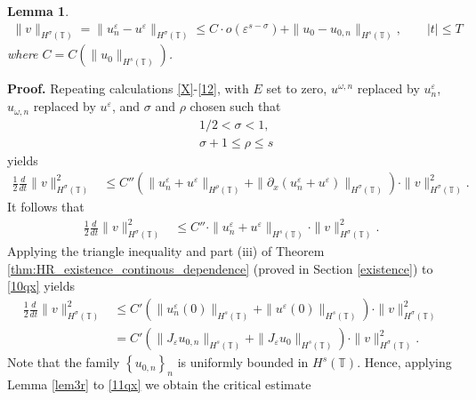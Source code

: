 \documentclass[12pt,reqno]{amsart}
\newcommand{\p}{\partial}
\newcommand{\ci}{\mathbb{T}}
\newcommand{\ee}{\varepsilon}
\theoremstyle{plain}  %
\newtheorem{lemma}{Lemma}
\theoremstyle{definition}
\begin{document}
\begin{appendices}
\begin{lemma}
\begin{equation}
\begin{split}
		\|v\|_{H^{\sigma}(\ci)} = 
		\|u^\ee_n - u^\ee\|_{H^\sigma(\ci)}
		\le C \cdot o(\ee^{s- \sigma }) + \|u_0 - u_{0,n} \|_{H^s(\ci)}, \qquad |t| \le T
	\end{split}
\end{equation}
where $C=C(\|u_0\|_{H^s(\ci)})$.
\end{lemma}
%
%
%
{\bf Proof.}
Repeating calculations \eqref{X}-\eqref{12}, with $E$ set to zero, $u^{\omega,n}$
replaced by $u^\ee_n$, $u_{\omega,n}$ replaced by $u^\ee$, and $\sigma$ and $\rho$ chosen such that
\begin{equation}
	\label{size_of_sigma'}
	\begin{split}
	& 1/2 < \sigma < 1,
	\\
	& \sigma + 1 \le \rho \le s 
	\end{split}
\end{equation}
yields
 \begin{equation*}
	\begin{split}
		\frac{1}{2}\frac{d}{dt} \|v\|_{H^\sigma(\ci)}^2
		& \le
		C'' (\|u^{\ee}_n + u^\ee \|_{H^{\rho}(\ci)} +
		\|\p_x(u^{\ee}_n + u^\ee) \|_{H^\sigma(\ci)})
		\cdot \|v\|_{H^\sigma(\ci)}^2.
	\end{split}
\end{equation*}
\medskip
It follows that 
\begin{equation}
	\begin{split}
		\frac{1}{2}\frac{d}{dt} \|v\|_{H^{\sigma}(\ci)}^2
		& \le
		C'' \cdot \|u^{\ee}_n
		+ u^\ee\|_{H^{s}(\ci)}\cdot \|v\|_{H^{\sigma}(\ci)}^2.
		\label{10qx}
	\end{split}
\end{equation}
Applying the triangle inequality and
part (iii) of Theorem \ref{thm:HR_existence_continous_dependence} (proved in
Section \ref{existence})
to \eqref{10qx} yields
%
\begin{equation}
	\begin{split}
		\label{11qx}
		\frac{1}{2}\frac{d}{dt} \|v\|_{H^{\sigma}(\ci)}^2
		& \le
		C' (\|u^{\ee}_n(0)\|_{H^{s}(\ci)}
		+ \|u^\ee(0)\|_{H^{s}(\ci)})\cdot \|v\|_{H^{\sigma}(\ci)}^2
		\\
		& = C' (\|J_\ee u_{0,n}\|_{H^{s}(\ci)}
		+ \|J_\ee u_0\|_{H^{s}(\ci)})\cdot \|v\|_{H^{\sigma}(\ci)}^2.
	\end{split}
\end{equation}
Note that the family $\left\{ u_{0,n} \right\}_n$ is uniformly bounded in
$H^s(\ci)$. Hence, applying Lemma \ref{lem3r} to \eqref{11qx} we obtain the critical estimate 
\begin{equation}

\end{equation}
\end{appendices}
\end{document}

